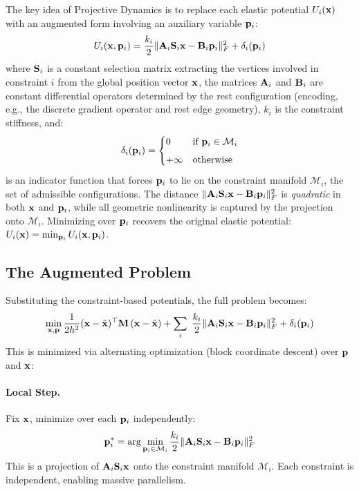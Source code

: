 The key idea of Projective Dynamics is to replace each elastic potential $U_i(\mathbf{x})$ with an augmented form involving an auxiliary variable $\mathbf{p}_i$:
\begin{equation}
    U_i(\mathbf{x}, \mathbf{p}_i) = \frac{k_i}{2} \|\mathbf{A}_i\mathbf{S}_i\mathbf{x} - \mathbf{B}_i\mathbf{p}_i\|^2_F + \delta_i(\mathbf{p}_i)
\end{equation}
where $\mathbf{S}_i$ is a constant selection matrix extracting the vertices involved in constraint $i$ from the global position vector $\mathbf{x}$, the matrices $\mathbf{A}_i$ and $\mathbf{B}_i$ are constant differential operators determined by the rest configuration (encoding, e.g., the discrete gradient operator and rest edge geometry), $k_i$ is the constraint stiffness, and:
\begin{equation}
    \delta_i(\mathbf{p}_i) = 
    \begin{cases}
        0 & \text{if } \mathbf{p}_i \in \mathcal{M}_i \\[1ex]
        +\infty & \text{otherwise}
    \end{cases}
\end{equation}
is an indicator function that forces $\mathbf{p}_i$ to lie on the constraint manifold $\mathcal{M}_i$, the set of admissible configurations. The distance $\|\mathbf{A}_i\mathbf{S}_i\mathbf{x} - \mathbf{B}_i\mathbf{p}_i\|^2_F$ is \emph{quadratic} in both $\mathbf{x}$ and $\mathbf{p}_i$, while all geometric nonlinearity is captured by the projection onto $\mathcal{M}_i$.
\newline Minimizing over $\mathbf{p}_i$ recovers the original elastic potential: $U_i(\mathbf{x}) = \min_{\mathbf{p}_i} U_i(\mathbf{x}, \mathbf{p}_i)$.

\subsection{The Augmented Problem}

Substituting the constraint-based potentials, the full problem becomes:
\begin{equation}
\min_{\mathbf{x}, \mathbf{p}} 
    \frac{1}{2h^2}(\mathbf{x} - \tilde{\mathbf{x}})^\top\mathbf{M}\,(\mathbf{x} - \tilde{\mathbf{x}}) + 
    \sum_i\;\frac{k_i}{2} \|\mathbf{A}_i\mathbf{S}_i\mathbf{x} - \mathbf{B}_i\mathbf{p}_i\|^2_F + \delta_i(\mathbf{p}_i)
\end{equation}
This is minimized via alternating optimization (block coordinate descent) over $\mathbf{p}$ and $\mathbf{x}$:

\paragraph{Local Step.} Fix $\mathbf{x}$, minimize over each $\mathbf{p}_i$ independently:
\begin{equation}
    \mathbf{p}_i^* = \arg\min_{\mathbf{p}_i \in \mathcal{M}_i} \frac{k_i}{2} \|\mathbf{A}_i\mathbf{S}_i\mathbf{x} - \mathbf{B}_i\mathbf{p}_i\|^2_F
\end{equation}
This is a projection of $\mathbf{A}_i\mathbf{S}_i\mathbf{x}$ onto the constraint manifold $\mathcal{M}_i$. Each constraint is independent, enabling massive parallelism. 

